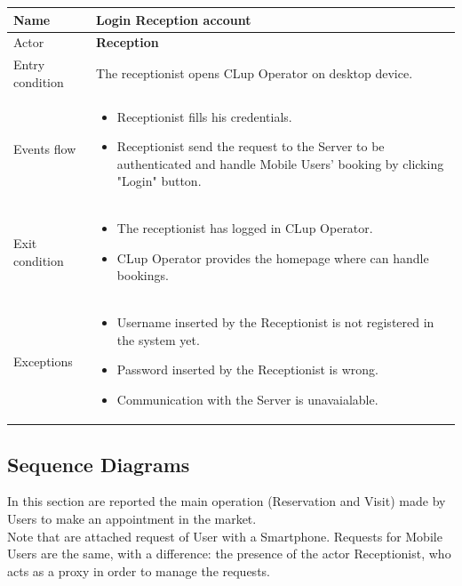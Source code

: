 \begin{tabular}{|p{5cm} | p{7cm} | }
	\hline
	Name & \textbf{Login Reception account} \\
	\hline
	Actor & \textbf{Reception} \\
	\hline
	Entry condition &
	The receptionist opens CLup Operator on desktop device.  \\
	\hline
	Events flow & 
	\begin{itemize}
		\item Receptionist fills his credentials.
		\item Receptionist send the request to the Server to be authenticated and handle Mobile Users' booking by clicking "Login" button.
	\end{itemize} \\
	\hline
	Exit condition & \begin{itemize}
	\item The receptionist has logged in CLup Operator.
    \item CLup Operator provides the homepage where can handle bookings.
    \end{itemize}
    \\
	\hline 
	Exceptions & 
	\begin{itemize}
		\item Username inserted by the Receptionist is not registered in the system yet.
	    \item Password inserted by the Receptionist is wrong.
        \item Communication with the Server is unavaialable.
	\end{itemize} \\
	\hline
\end{tabular}

\pagebreak

\subsection{Sequence Diagrams}
In this section are reported the main operation (Reservation and Visit) made by  Users to make an appointment in the market.\\
Note that are attached request of User with a Smartphone. Requests for Mobile Users are the same, with a difference: the presence of the actor Receptionist, who acts as a proxy in order to manage the requests.


